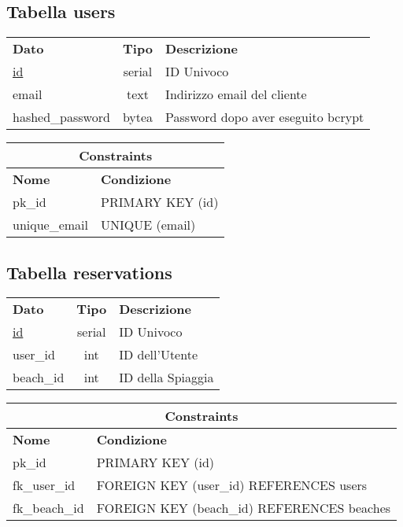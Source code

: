 \begin{center}
    \subsection*{Tabella \textnormal{users}}
    
    \begin{tabularx}{\textwidth}{l c X}
        \toprule
        \textbf{Dato} & \textbf{Tipo} & \textbf{Descrizione}\\
        \underline{id} & serial & ID Univoco \\
        email & text & Indirizzo email del cliente\\
        hashed\_password & bytea & Password dopo aver eseguito bcrypt\\
        \midrule
    \end{tabularx}
    \begin{tabularx}{\textwidth}{l X}
        \multicolumn{2}{c}{\textbf{Constraints}}\\
        \midrule
        \textbf{Nome} & \textbf{Condizione}\\
        pk\_id & PRIMARY KEY (id)\\
        unique\_email & UNIQUE (email)\\
        \bottomrule
    \end{tabularx}
    \bigskip
\end{center}

\begin{center}
    \subsection*{Tabella \textnormal{reservations}}
    
    \begin{tabularx}{\textwidth}{l c X}
        \toprule
        \textbf{Dato} & \textbf{Tipo} & \textbf{Descrizione}\\
        \underline{id} & serial & ID Univoco \\
        user\_id & int & ID dell'Utente\\
        beach\_id & int & ID della Spiaggia\\
        \midrule
    \end{tabularx}
    \begin{tabularx}{\textwidth}{l X}
        \multicolumn{2}{c}{\textbf{Constraints}}\\
        \midrule
        \textbf{Nome} & \textbf{Condizione}\\
        pk\_id & PRIMARY KEY (id)\\
        fk\_user\_id & FOREIGN KEY (user\_id) REFERENCES users\\
        fk\_beach\_id & FOREIGN KEY (beach\_id) REFERENCES beaches\\
        \bottomrule
    \end{tabularx}
    \bigskip
\end{center}

